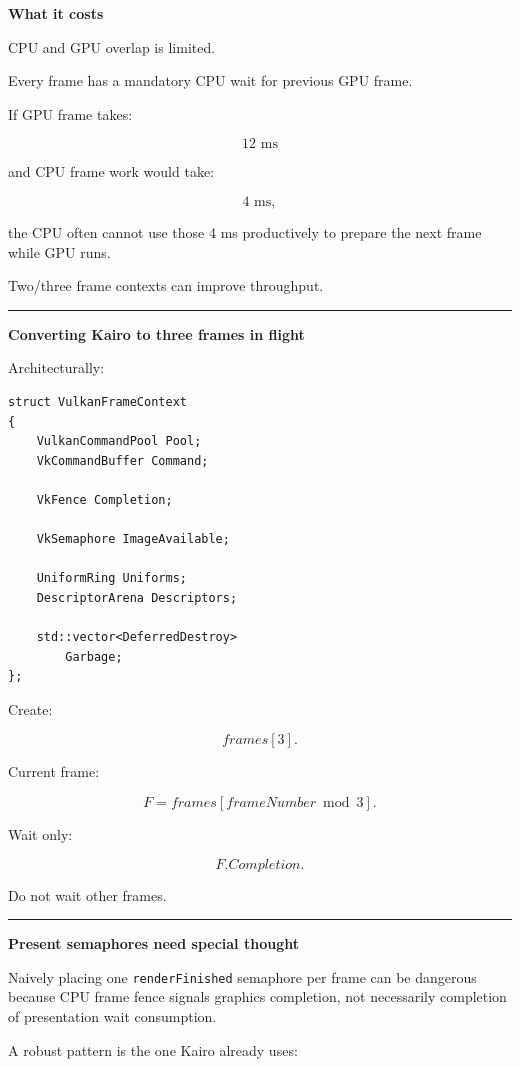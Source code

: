 \textbf{What it costs}

CPU and GPU overlap is limited.

Every frame has a mandatory CPU wait for previous GPU frame.

If GPU frame takes:

\[
12\text{ ms}
\]

and CPU frame work would take:

\[
4\text{ ms},
\]

the CPU often cannot use those 4 ms productively to prepare the next frame while GPU runs.

Two/three frame contexts can improve throughput.

\begin{center}\rule{0.5\linewidth}{0.5pt}\end{center}

\textbf{Converting Kairo to three frames in flight}

Architecturally:

\begin{verbatim}
struct VulkanFrameContext
{
    VulkanCommandPool Pool;
    VkCommandBuffer Command;

    VkFence Completion;

    VkSemaphore ImageAvailable;

    UniformRing Uniforms;
    DescriptorArena Descriptors;

    std::vector<DeferredDestroy>
        Garbage;
};
\end{verbatim}

Create:

\[
frames[3].
\]

Current frame:

\[
F=
frames[
frameNumber\bmod3
].
\]

Wait only:

\[
F.Completion.
\]

Do not wait other frames.

\begin{center}\rule{0.5\linewidth}{0.5pt}\end{center}

\textbf{Present semaphores need special thought}

Naively placing one \texttt{renderFinished} semaphore per frame can be dangerous because CPU frame fence signals graphics completion, not necessarily completion of presentation wait consumption.

A robust pattern is the one Kairo already uses:

